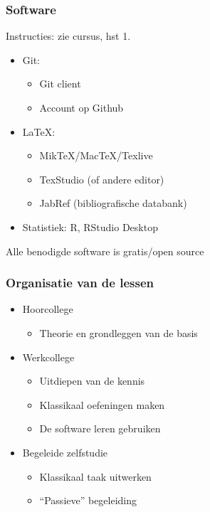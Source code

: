 \documentclass[aspectratio=169]{beamer}
\begin{document}
\begin{frame}
  \frametitle{Software}
  
  Instructies: zie cursus, hst 1.
  
  \begin{itemize}
      \item Git:
      \begin{itemize}
          \item Git client
          \item Account op Github
      \end{itemize}
      \item {\LaTeX}:
      \begin{itemize}
          \item MikTeX/MacTeX/Texlive
          \item TexStudio (of andere editor)
          \item JabRef (bibliografische databank)
      \end{itemize}
      \item Statistiek: R, RStudio Desktop
  \end{itemize}

  \centering
  Alle benodigde software is gratis/open source
\end{frame}

\begin{frame}
  \frametitle{Organisatie van de lessen}

  \begin{itemize}
    \item Hoorcollege
      \begin{itemize}
        \item Theorie en grondleggen van de basis
      \end{itemize}
    \item Werkcollege
      \begin{itemize}
        \item Uitdiepen van de kennis
        \item Klassikaal oefeningen maken
        \item De software leren gebruiken
      \end{itemize}
    \item Begeleide zelfstudie
      \begin{itemize}
        \item Klassikaal taak uitwerken
        \item ``Passieve'' begeleiding
      \end{itemize}
  \end{itemize}
\end{frame}
\end{document}
